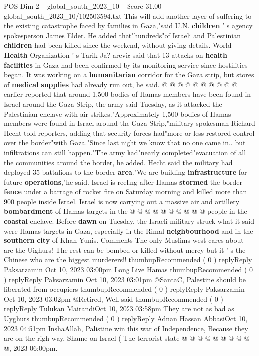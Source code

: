 \begin{textsample}{POS Dim 2 – global\_south\_2023\_10 – Score 31.00 – global\_south\_2023\_10/102503594.txt}
This will add another layer of suffering to the existing catastrophe faced by families in Gaza,"said U.N. \textbf{children} ' s agency spokesperson James Elder.
He added that"hundreds"of Israeli and Palestinian \textbf{children} had been killed since the weekend, without giving details.
World \textbf{Health} Organization ' s Tarik Ja? arevic said that 13 attacks on \textbf{health} \textbf{facilities} in Gaza had been confirmed by its monitoring service since hostilities began.
It was working on a \textbf{humanitarian} corridor for the Gaza strip, but stores of \textbf{medical} \textbf{supplies} had already run out, he said. @ @ @ @ @ @ @ @ @ @ earlier reported that around 1,500 bodies of Hamas members have been found in Israel around the Gaza Strip, the army said Tuesday, as it attacked the Palestinian enclave with air strikes."Approximately 1,500 bodies of Hamas members were found in Israel around the Gaza Strip,"military spokesman Richard Hecht told reporters, adding that security forces had"more or less restored control over the border"with Gaza."Since last night we know that no one came in.. but infiltrations can still happen."The army had"nearly completed"evacuation of all the communities around the border, he added.
Hecht said the military had deployed 35 battalions to the border \textbf{area}."We are building \textbf{infrastructure} for future \textbf{operations},"he said.
Israel is reeling after Hamas \textbf{stormed} the border \textbf{fence} under a barrage of rocket fire on Saturday morning and killed more than 900 people inside Israel.
Israel is now carrying out a massive air and artillery \textbf{bombardment} of Hamas targets in the @ @ @ @ @ @ @ @ @ @ people in the \textbf{coastal} enclave.
Before \textbf{dawn} on Tuesday, the Israeli military struck what it said were Hamas targets in Gaza, especially in the Rimal \textbf{neighbourhood} and in the \textbf{southern} \textbf{city} of Khan Yunis.
Comments The only Muslims west cares about are the Uighurs!
The rest can be bombed or killed without mercy but it ' s the Chinese who are the biggest murderers!! thumbupRecommended ( 0 ) replyReply Paksarzamin Oct 10, 2023 03:00pm Long Live Hamas thumbupRecommended ( 0 ) replyReply Paksarzamin Oct 10, 2023 03:01pm @SantaC, Palestine should be liberated from occupiers thumbupRecommended ( 0 ) replyReply Paksarzamin Oct 10, 2023 03:02pm @Retired, Well said thumbupRecommended ( 0 ) replyReply Tulukan MairandiOct 10, 2023 03:58pm They are not as bad as Uyghurs thumbupRecommended ( 0 ) replyReply Adnan Hassan AbbasiOct 10, 2023 04:51pm InshaAllah, Palistine win this war of Independence, Because they are on the righ way, Shame on Israel ( The terrorist state @ @ @ @ @ @ @ @ @ @, 2023 06:00pm.

\end{textsample}
